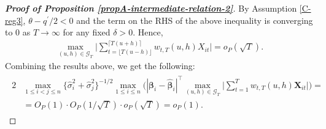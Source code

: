 \documentclass[a4paper,12pt]{article}
\begin{document}
\begin{proof}[\textnormal{\textbf{Proof of Proposition \ref{propA-intermediate-relation-2}}}]
By Assumption \ref{C-reg3}, $\theta - q^\prime/2 <0$ and the term on the RHS of the above inequality is converging to $0$ as $T \to \infty$ for any fixed $\delta >0$. Hence, 
\begin{align*}
\max_{(u, h) \in \mathcal{G}_T} \Big| \sum_{t=\lfloor T(u-h) \rfloor}^{\lceil T(u+h) \rceil} w_{t,T}(u,h)X_{it}  \Big| = o_P(\sqrt{T}).
\end{align*}
Combining the results above, we get the following:
\begin{align}\label{ineq-diff-3}
\begin{split}
2&\max_{1\le i < j \le n} \{\widehat{\sigma}_i^2+ \widehat{\sigma}_j^2 \}^{-1/2}\max_{1\le i \le n} \bigg(|\bm{\beta}_i - \widehat{\bm{\beta}}_i|^\top \max_{(u,h) \in \mathcal{G}_T} \Big| \sum_{t=1}^T w_{t,T}(u,h) \mathbf{X}_{it} \Big|\bigg)  =  \\
&=O_P(1) \cdot O_P(1/\sqrt{T}) \cdot o_P(\sqrt{T}) = o_P(1).
\end{split}
\end{align}



\end{proof}
\end{document}
